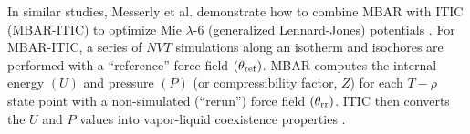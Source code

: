 \documentclass[journal=jced,manuscript=article]{achemso}
\begin{document}

In similar studies, Messerly et al. demonstrate how to combine MBAR with ITIC (MBAR-ITIC) to optimize Mie $\lambda$-6 (generalized Lennard-Jones) potentials \cite{Postdoc_1,Postdoc_2}. For MBAR-ITIC, a series of $NVT$ simulations along an isotherm and isochores are performed with a ``reference'' force field $(\theta_{\rm ref})$. MBAR computes the internal energy $(U)$ and pressure $(P)$ (or compressibility factor, $Z$) for each $T-\rho$ state point with a non-simulated (``rerun'') force field $(\theta_{\rm rr})$. ITIC then converts the $U$ and $P$ values into vapor-liquid coexistence properties \cite{Mostafa_Diss,Mostafa2018}.



\end{document}
